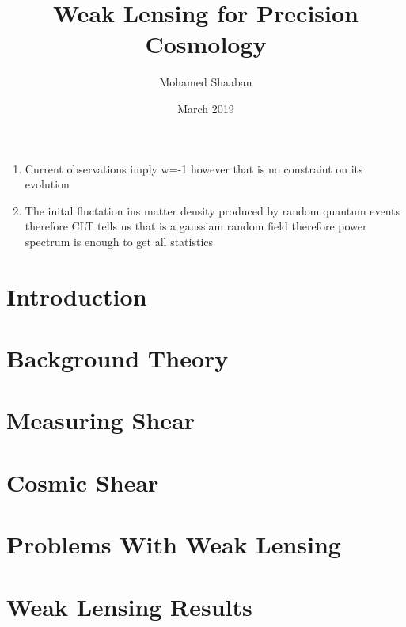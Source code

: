 \documentclass{article}
\title{Weak Lensing for Precision Cosmology}
\author{Mohamed Shaaban}
\date{March 2019}
\begin{document}
\maketitle

\begin{enumerate}
    \item Current observations imply w=-1 however that is no constraint on its evolution
    \item The inital fluctation ins matter density produced by random quantum events therefore CLT tells us that is a gaussiam random field therefore power spectrum is enough to get all statistics
\end{enumerate}


\section{Introduction}


\section{Background Theory}


\section{Measuring Shear}

\section{Cosmic Shear}
\cite{lensingbook} \cite{rachel_2018} \cite{hoekstra}

\section{Problems With Weak Lensing}
\cite{massey_2013}

\section{Weak Lensing Results}
\cite{Subaru_2019}



\end{document}
